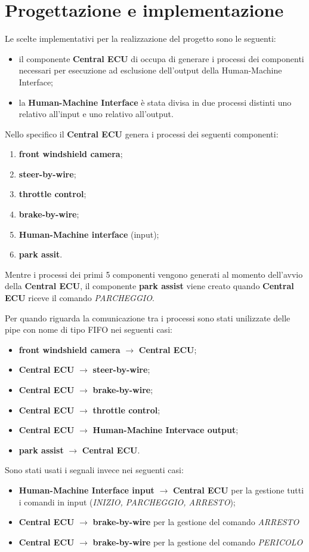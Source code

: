 \documentclass[12pt]{article}
\begin{document}
\section{Progettazione e implementazione}
Le scelte implementativi per la realizzazione del progetto sono le seguenti:
\begin{itemize}
    \item il componente {\bf Central ECU} di occupa di generare i processi dei 
    componenti necessari per esecuzione ad esclusione dell'output della Human-Machine 
    Interface;
    \item la {\bf Human-Machine Interface} \`{e} stata divisa in due processi 
    distinti uno relativo all'input e uno relativo all'output. 
\end{itemize}
Nello specifico il {\bf Central ECU} genera i processi dei seguenti componenti:
\begin{enumerate}
    \item {\bf front windshield camera};
    \item {\bf steer-by-wire};
    \item {\bf throttle control};
    \item {\bf brake-by-wire};
    \item {\bf Human-Machine interface} (input);
    \item {\bf park assit}.
\end{enumerate}
Mentre i processi dei primi 5 componenti vengono generati al momento dell'avvio 
della {\bf Central ECU}, il componente {\bf park assist} viene creato quando 
{\bf Central ECU} riceve il comando {\it PARCHEGGIO}. 

Per quando riguarda la comunicazione tra i processi sono stati unilizzate delle 
pipe con nome di tipo FIFO nei seguenti casi:
\begin{itemize}
    \item {\bf front windshield camera} $\to$ {\bf Central ECU};
    \item {\bf Central ECU} $\to$ {\bf steer-by-wire};
    \item {\bf Central ECU} $\to$ {\bf brake-by-wire};
    \item {\bf Central ECU} $\to$ {\bf throttle control};
    \item {\bf Central ECU} $\to$ {\bf Human-Machine Intervace output};
    \item {\bf park assist} $\to$ {\bf Central ECU}.
\end{itemize} 

Sono stati usati i segnali invece nei seguenti casi:
\begin{itemize}
    \item {\bf Human-Machine Interface input} $\to$ {\bf Central ECU} per la 
    gestione tutti i comandi in input ({\it INIZIO, PARCHEGGIO, ARRESTO});
    \item {\bf Central ECU} $\to$ {\bf brake-by-wire} per la gestione del comando 
    {\it ARRESTO}
    \item  {\bf Central ECU} $\to$ {\bf brake-by-wire} per la gestione del comando 
    {\it PERICOLO}
\end{itemize}
\end{document}
